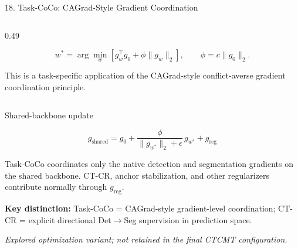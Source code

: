 \documentclass[aspectratio=169,11pt]{beamer}
\begin{document}
\begin{frame}{18. Task-CoCo: CAGrad-Style Gradient Coordination}
\begin{columns}[T,onlytextwidth]
\begin{column}{0.49\textwidth}
\vspace{-0.05cm}

\[
w^*
=
\arg\min_w
\left[
g_w^\top g_0
+
\phi\|g_w\|_2
\right],
\qquad
\phi=c\|g_0\|_2.
\]

{\tiny
This is a task-specific application of the CAGrad-style
conflict-averse gradient coordination principle.
}

\end{column}

\end{columns}

\vspace{0.05cm}

\begin{block}{Shared-backbone update}
\vspace{-0.1cm}

\[
\boxed{
g_{\mathrm{shared}}
=
g_0
+
\frac{\phi}
{\|g_{w^*}\|_2+\epsilon}
\,g_{w^*}
+
g_{\mathrm{reg}}
}
\]


{\tiny
Task-CoCo coordinates only the native detection and segmentation gradients
on the shared backbone.
CT-CR, anchor stabilization, and other regularizers contribute normally
through $g_{\mathrm{reg}}$.
}
\end{block}

\vspace{-0.08cm}

{\tiny
\textbf{Key distinction:}
Task-CoCo = CAGrad-style gradient-level coordination;
CT-CR = explicit directional Det$\rightarrow$Seg supervision in prediction space.

\textit{Explored optimization variant; not retained in the final CTCMT configuration.}
}

\end{frame}
\end{document}
